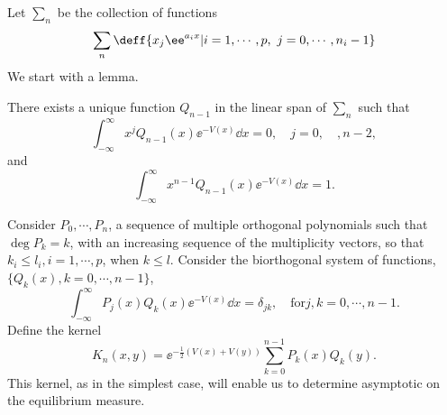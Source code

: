 Let $\sum_n$ be the collection of functions 
\begin{equation}
\sum_n \deff \{ x_j \ee^{a_i x} | i = 1, \cdots , p, \ j = 0, \cdots , n_i - 1 \}
\end{equation}		
We start with a lemma.
\begin{lemma}
	There exists a unique function $Q_{n-1}$ in the linear span of $\sum_n$ such that
	\begin{equation}
		\int_{-\infty}^{\infty} x^j Q_{n-1}(x) \ee^{-V(x)} \dd x = 0, \quad j = 0, \quad , n-2,
	\end{equation}
	 and 
	 \begin{equation}
	 	\int_{-\infty}^{\infty} x^{n-1} Q_{n-1}(x) \ee^{-V(x)} \dd x = 1. 
	 \end{equation}
\end{lemma}
Consider $P_0, \cdots, P_n$, a sequence of multiple orthogonal polynomials such that $\deg P_k = k$, with an increasing sequence of the multiplicity vectors, so that $k_i \leq l_i, i = 1, \cdots , p$, when $k \leq l$. Consider the biorthogonal system of functions, $\{ Q_k(x), k = 0, \cdots , n-1\}$, 
\begin{equation}
	\int_{-\infty}^{\infty} P_j(x) Q_k(x) \ee^{-V(x)} \dd x = \delta_{jk}, \quad \text{for} j, k = 0, \cdots , n-1. 
\end{equation}
Define the kernel 
\begin{equation}
	K_n(x, y) = \ee^{-\frac{1}{2}(V(x)+V(y))}  \sum^{n-1}_{k=0} P_k(x)Q_k(y). 
\end{equation}
This kernel, as in the simplest case, will enable us to determine asymptotic on the equilibrium measure.
